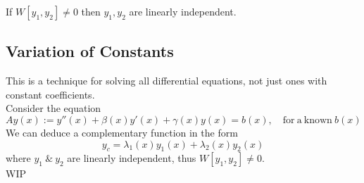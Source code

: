 \documentclass[11pt,a4paper]{article}
\begin{document}
\subtitle{Remark 6.12}{}
If $W[y_1, y_2] \not = 0$ then $y_1, y_2$ are linearly independent.

\subsection{Variation of Constants}
%
\subtitle{Theorem 6.12}{}
This is a technique for solving all differential equations, not just ones with constant coefficients. \\
Consider the equation $$Ay(x) := y''(x) + \beta(x)y'(x) + \gamma(x)y(x) = b(x),\quad \mathrm{for\ a\ known\ }b(x)$$
We can deduce a complementary function in the form $$y_c = \lambda_1(x)y_1(x) + \lambda_2(x)y_2(x)$$ where $y_1\ \&\ y_2$ are linearly independent, thus $W[y_1, y_2] \not = 0$. \\
\huge{WIP}
\end{document}
